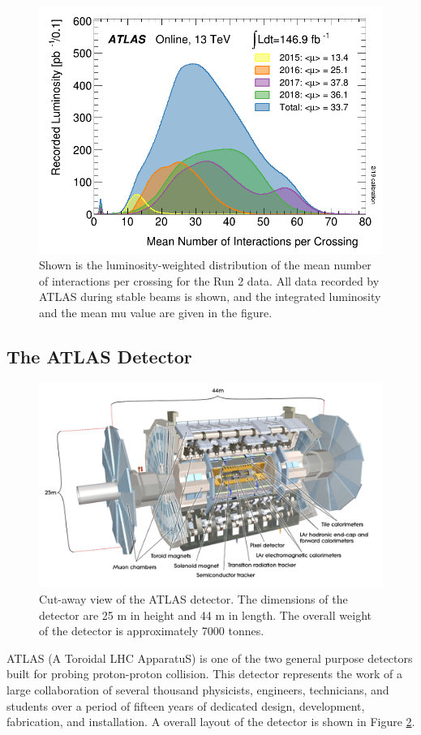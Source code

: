 \documentclass[letterpaper,12pt]{article}
\begin{document}
	\begin{figure}[]
		\begin{centering}	
		\includegraphics[width=.4\textwidth]{Detector_plots/Run2_pileup.png}
		\caption{ Shown is the luminosity-weighted distribution of the mean number of 
		interactions per crossing for the Run 2 data. All data recorded by ATLAS during 
		stable beams is shown, and the integrated luminosity and 
		the mean mu value are given in the figure. 
			}
		\label{fig:Run2_pileup}
		\end{centering}
	\end{figure}




\subsection{The ATLAS Detector}

\begin{figure}[]
	\begin{centering}	
	\includegraphics[width=.4\textwidth]{Detector_plots/Cut-away-view-of-the-ATLAS-detector.png}
	\caption{Cut-away view of the ATLAS detector. 
	The dimensions of the detector are 25 m in
	height and 44 m in length. The overall weight 
	of the detector is approximately 7000 tonnes.
		}
	\label{fig:ATLAS_cut_away}
	\end{centering}
\end{figure}

ATLAS (A Toroidal LHC ApparatuS) is one of the 
two general purpose detectors built for probing proton-proton 
collision. This detector represents the work of a large collaboration 
of several thousand physicists, engineers, technicians,
and students over a period of fifteen years of dedicated 
design, development, fabrication, and installation.
A overall layout of the detector is shown in Figure \ref{fig:ATLAS_cut_away}.
\end{document}
